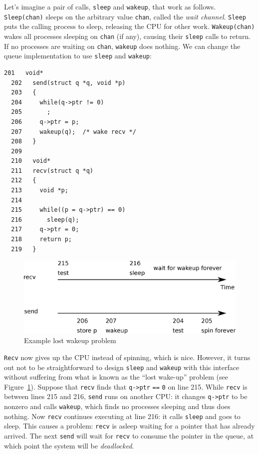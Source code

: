 Let's imagine a pair of calls, 
\lstinline{sleep}
and
\lstinline{wakeup},
that work as follows.
\lstinline{Sleep(chan)}
sleeps on the arbitrary value
\lstinline{chan},
called the 
\textit{wait channel}.
\lstinline{Sleep}
puts the calling process to sleep, releasing the CPU
for other work.
\lstinline{Wakeup(chan)}
wakes all processes sleeping on
\lstinline{chan}
(if any), causing their
\lstinline{sleep}
calls to return.
If no processes are waiting on
\lstinline{chan},
\lstinline{wakeup}
does nothing.
We can change the queue implementation to use
\lstinline{sleep}
and
\lstinline{wakeup}:
\begin{lstlisting}[]
  201	void*
  202	send(struct q *q, void *p)
  203	{
  204	  while(q->ptr != 0)
  205	    ;
  206	  q->ptr = p;
  207	  wakeup(q);  /* wake recv */
  208	}
  209	
  210	void*
  211	recv(struct q *q)
  212	{
  213	  void *p;
  214	
  215	  while((p = q->ptr) == 0)
  216	    sleep(q);
  217	  q->ptr = 0;
  218	  return p;
  219	}
\end{lstlisting}

\begin{figure}[t]
\center
\includegraphics[scale=0.5]{fig/deadlock.eps}
\caption{Example lost wakeup problem}
\label{fig:deadlock}
\end{figure}

\lstinline{Recv}
now gives up the CPU instead of spinning, which is nice.
However, it turns out not to be straightforward to design
\lstinline{sleep}
and 
\lstinline{wakeup}
with this interface without suffering
from what is known as the ``lost wake-up'' problem (see 
Figure~\ref{fig:deadlock}).
Suppose that
\lstinline{recv}
finds that
\lstinline{q->ptr}
\lstinline{==}
\lstinline{0} 
on line 215.
While
\lstinline{recv}
is between lines 215 and 216,
\lstinline{send}
runs on another CPU:
it changes
\lstinline{q->ptr}
to be nonzero and calls
\lstinline{wakeup},
which finds no processes sleeping and thus does nothing.
Now
\lstinline{recv}
continues executing at line 216:
it calls
\lstinline{sleep}
and goes to sleep.
This causes a problem:
\lstinline{recv}
is asleep waiting for a pointer
that has already arrived.
The next
\lstinline{send}
will wait for 
\lstinline{recv}
to consume the pointer in the queue,
at which point the system will be 
\textit{deadlocked}.

